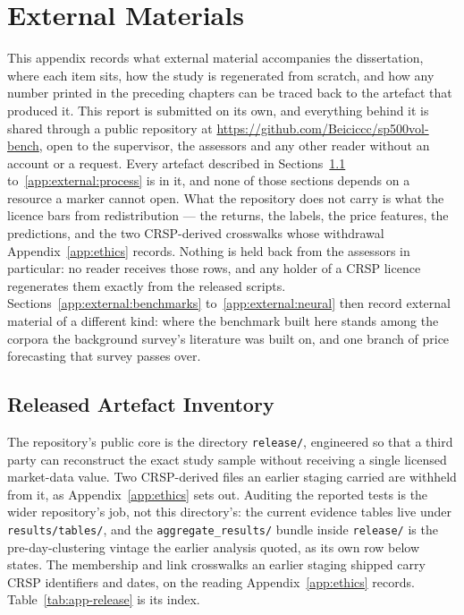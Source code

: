 \chapter{External Materials}
\label{app:external}

This appendix records what external material accompanies the dissertation, where
each item sits, how the study is regenerated from scratch, and how any number
printed in the preceding chapters can be traced back to the artefact that
produced it. This report is submitted on its own, and everything behind it is shared through a
public repository at \url{https://github.com/Beiciccc/sp500vol-bench}, open to the
supervisor, the assessors and any other reader without an account or a request.
Every artefact described in Sections~\ref{app:external:release}
to~\ref{app:external:process} is in it, and none of those sections depends on a
resource a marker cannot open. What the repository does not carry is what the
licence bars from redistribution --- the returns, the labels, the price features,
the predictions, and the two CRSP-derived crosswalks whose withdrawal
Appendix~\ref{app:ethics} records. Nothing is held back from the assessors in
particular: no reader receives those rows, and any holder of a CRSP licence
regenerates them exactly from the released scripts.
Sections~\ref{app:external:benchmarks} to~\ref{app:external:neural} then record
external material of a different kind: where the benchmark built here stands
among the corpora the background survey's literature was built on, and one
branch of price forecasting that survey passes over.

\FloatBarrier
\section{Released Artefact Inventory}
\label{app:external:release}

The repository's public core is the directory \texttt{release/}, engineered so that a
third party can reconstruct the exact study sample without receiving a single
licensed market-data value. Two CRSP-derived files an earlier staging
carried are withheld from it, as Appendix~\ref{app:ethics} sets out. Auditing the reported tests is the wider
repository's job, not this directory's: the current evidence tables live under
\texttt{results/tables/}, and the \texttt{aggregate\_results/} bundle inside
\texttt{release/} is the pre-day-clustering vintage the earlier analysis quoted,
as its own row below states. The
membership and link crosswalks an earlier staging shipped carry CRSP identifiers and dates, on the
reading Appendix~\ref{app:ethics} records.
Table~\ref{tab:app-release} is its index.

